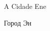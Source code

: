 \newpage
\MyriadPro\itshape
\begin{center}
\small
A Cidade Ene

Город Эн
\end{center}

\scriptsize


%









